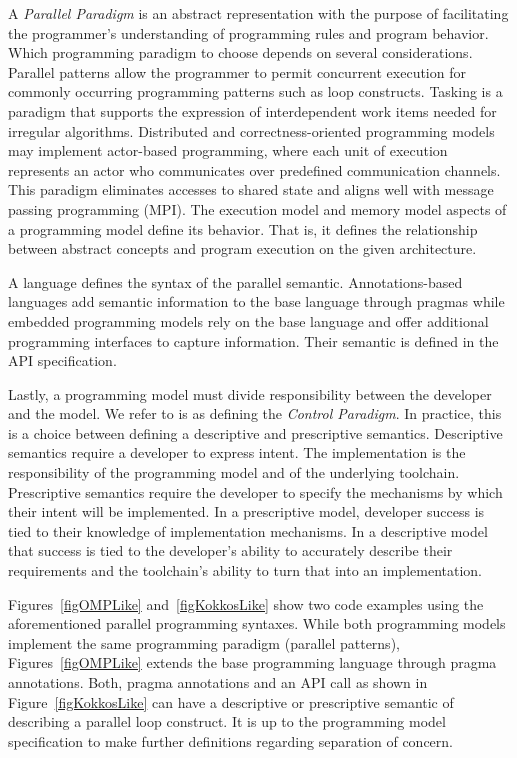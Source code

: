 A \emph{Parallel Paradigm} is an abstract representation with the purpose of facilitating the programmer's understanding of programming rules and program behavior. Which programming paradigm to choose depends on several considerations. Parallel patterns allow the programmer to permit concurrent execution for commonly occurring programming patterns such as loop constructs. Tasking is a paradigm that supports the expression of interdependent work items needed for irregular algorithms. Distributed and correctness-oriented programming models may implement actor-based programming, where each unit of execution represents an actor who communicates over predefined communication channels. This paradigm eliminates accesses to shared state and aligns well with message passing programming (MPI). The execution model and memory model aspects of a programming model define its behavior. That is, it defines the relationship between abstract concepts and program execution on the given architecture.

A language defines the syntax of the parallel semantic. Annotations-based  languages add semantic information to the base language through pragmas while embedded programming models rely on the base language and offer additional programming interfaces to capture information. Their semantic is defined in the API specification. 

Lastly, a programming model must divide responsibility between the developer and the model. We refer to is as defining the \emph{Control Paradigm}. In practice, this is a choice between defining a descriptive and prescriptive semantics. Descriptive semantics require a developer to express intent. The implementation is the responsibility of the programming model and of the underlying toolchain. Prescriptive semantics require the developer to specify the mechanisms by which their intent will be implemented. In a prescriptive model, developer success is tied to their knowledge of implementation mechanisms. In a descriptive model that success is tied to the developer's ability to accurately describe their requirements and the toolchain's ability to turn that into an implementation. 

Figures~\ref{figOMPLike} and~\ref{figKokkosLike} show two code examples using the aforementioned parallel programming syntaxes. While both programming models implement the same programming paradigm (parallel patterns), Figures~\ref{figOMPLike} extends the base programming language through pragma annotations. Both, pragma annotations and an API call as shown in Figure~\ref{figKokkosLike} can have a descriptive or prescriptive semantic of describing a parallel loop construct. It is up to the programming model specification to make further definitions regarding separation of concern.

